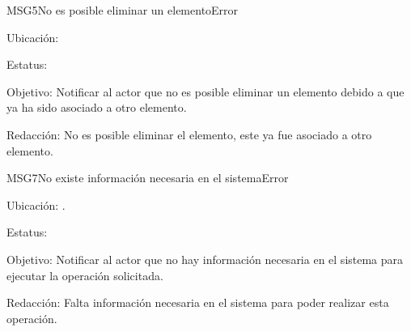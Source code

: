 \begin{mensaje}{MSG5}{No es posible eliminar un elemento}{Error}
	\item[Ubicación:] \msjEmergente
	\item[Estatus:] %
	\item[Objetivo:] Notificar al actor que no es posible eliminar un elemento debido a que ya ha sido asociado a otro elemento.
	\item[Redacción:] No es posible eliminar el elemento, este ya fue asociado a otro elemento.

\end{mensaje}

\begin{mensaje}{MSG7}{No existe información necesaria en el sistema}{Error}
	\item[Ubicación:] \msjSuperior.
	\item[Estatus:] %
	\item[Objetivo:] Notificar al actor que no hay información necesaria en el sistema para ejecutar la operación solicitada.
	\item[Redacción:] Falta información necesaria en el sistema para poder realizar esta operación.
\end{mensaje}

